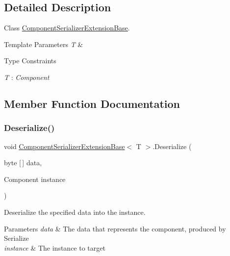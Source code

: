 \subsection{Detailed Description}
Class \hyperlink{class_component_serializer_extension_base}{Component\+Serializer\+Extension\+Base}. 


\begin{DoxyTemplParams}{Template Parameters}
{\em T} & \\
\hline
\end{DoxyTemplParams}
\begin{Desc}
\item[Type Constraints]\begin{description}
\item[{\em T} : {\em Component}]\end{description}
\end{Desc}


\subsection{Member Function Documentation}
\mbox{\label{class_component_serializer_extension_base_a003b02386876cd68c588aef276124b0c}} 
\subsubsection{\texorpdfstring{Deserialize()}{Deserialize()}}
{\footnotesize\ttfamily void \hyperlink{class_component_serializer_extension_base}{Component\+Serializer\+Extension\+Base}$<$ T $>$.Deserialize (\begin{DoxyParamCaption}\item[{byte \mbox{[}$\,$\mbox{]}}]{data,  }\item[{Component}]{instance }\end{DoxyParamCaption})\hspace{0.3cm}{\ttfamily [inline]}}



Deserialize the specified data into the instance. 


\begin{DoxyParams}{Parameters}
{\em data} & The data that represents the component, produced by Serialize\\
\hline
{\em instance} & The instance to target\\
\hline
\end{DoxyParams}


